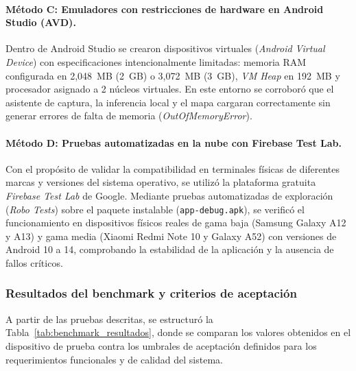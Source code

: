 \paragraph{Método C: Emuladores con restricciones de hardware en Android Studio (AVD).}
Dentro de Android Studio se crearon dispositivos virtuales (\textit{Android Virtual Device}) con especificaciones intencionalmente limitadas: memoria RAM configurada en 2,048~MB (2~GB) o 3,072~MB (3~GB), \textit{VM Heap} en 192~MB y procesador asignado a 2 núcleos virtuales. En este entorno se corroboró que el asistente de captura, la inferencia local y el mapa cargaran correctamente sin generar errores de falta de memoria (\textit{OutOfMemoryError}).

\paragraph{Método D: Pruebas automatizadas en la nube con Firebase Test Lab.}
Con el propósito de validar la compatibilidad en terminales físicas de diferentes marcas y versiones del sistema operativo, se utilizó la plataforma gratuita \textit{Firebase Test Lab} de Google. Mediante pruebas automatizadas de exploración (\textit{Robo Tests}) sobre el paquete instalable (\texttt{app-debug.apk}), se verificó el funcionamiento en dispositivos físicos reales de gama baja (Samsung Galaxy A12 y A13) y gama media (Xiaomi Redmi Note 10 y Galaxy A52) con versiones de Android 10 a 14, comprobando la estabilidad de la aplicación y la ausencia de fallos críticos.

\subsubsection{Resultados del benchmark y criterios de aceptación}
\label{subsubsec:resultados-benchmark}

A partir de las pruebas descritas, se estructuró la Tabla~\ref{tab:benchmark_resultados}, donde se comparan los valores obtenidos en el dispositivo de prueba contra los umbrales de aceptación definidos para los requerimientos funcionales y de calidad del sistema.


